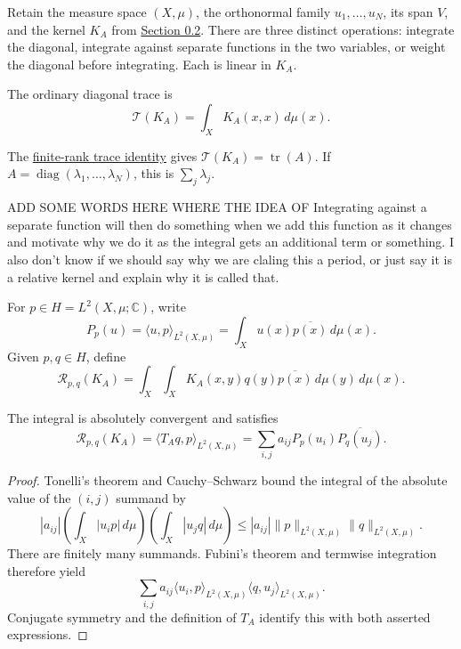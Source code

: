 \label{three-finite-kernel-constructions}

Retain the measure space $(X,\mu)$, the orthonormal family $u_1,\ldots,u_N$, its span $V$, and the kernel $K_A$ from \hyperref[v1a-ch00-s2]{Section 0.2}. There are three distinct operations: integrate the diagonal, integrate against separate functions in the two variables, or weight the diagonal before integrating. Each is linear in $K_A$.

\begin{definition}\label{ordinary-finite-trace}

The ordinary diagonal trace is
\[
\mathcal T(K_A)=\int_XK_A(x,x)\,d\mu(x).
\]
\end{definition}

The \hyperref[finite-kernel-trace-identity]{finite-rank trace identity} gives $\mathcal T(K_A)=\operatorname{tr}(A)$. If $A=\operatorname{diag}(\lambda_1,\ldots,\lambda_N)$, this is $\sum_j\lambda_j$. 


ADD SOME WORDS HERE WHERE THE IDEA OF Integrating against a separate function will then do something when we add this function as it changes and motivate why we do it as the integral gets an additional term or something. I also don't know if we should say why we are claling this a period, or just say it is a relative kernel and explain why it is called that. 

\begin{definition}\label{relative-finite-pairing}

For $p\in H=L^2(X,\mu;\mathbb C)$, write
\[
P_p(u)=\langle u,p\rangle_{L^2(X,\mu)}
=\int_Xu(x)\overline{p(x)}\,d\mu(x).
\]
Given $p,q\in H$, define
\[
\mathcal R_{p,q}(K_A)
=\int_X\int_XK_A(x,y)q(y)\overline{p(x)}\,d\mu(y)\,d\mu(x).
\]
\end{definition}

\begin{proposition}\label{finite-relative-kernel-identity}
The integral is absolutely convergent and satisfies
\[
\mathcal R_{p,q}(K_A)
=\langle T_Aq,p\rangle_{L^2(X,\mu)}
=\sum_{i,j}a_{ij}P_p(u_i)\overline{P_q(u_j)}.
\]
\end{proposition}

\begin{proof}
Tonelli's theorem and Cauchy--Schwarz bound the integral of the absolute value of the $(i,j)$ summand by
\[
|a_{ij}|\left(\int_X|u_i p|\,d\mu\right)
\left(\int_X|u_j q|\,d\mu\right)
\leq |a_{ij}|\|p\|_{L^2(X,\mu)}\|q\|_{L^2(X,\mu)}.
\]
There are finitely many summands. Fubini's theorem and termwise integration therefore yield
\[
\sum_{i,j}a_{ij}\langle u_i,p\rangle_{L^2(X,\mu)}\langle q,u_j\rangle_{L^2(X,\mu)}.
\]
Conjugate symmetry and the definition of $T_A$ identify this with both asserted expressions.
\end{proof}

